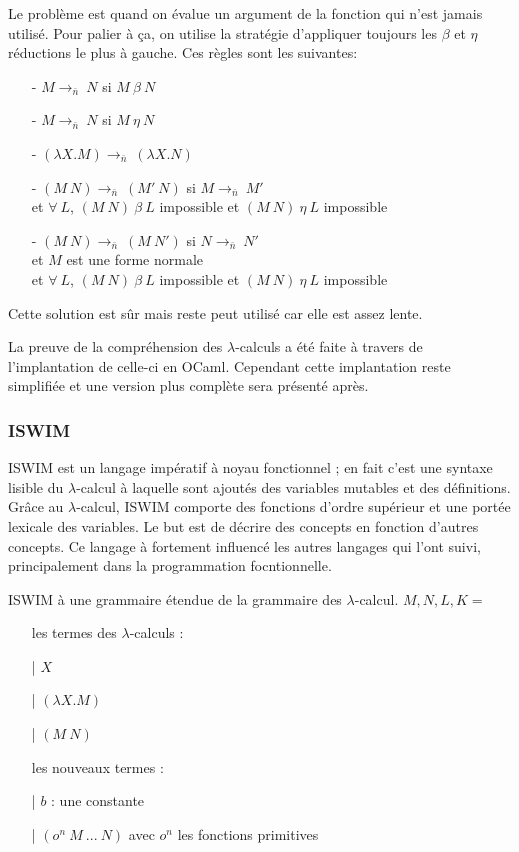 \documentclass[10pt,a4paper]{article}
\begin{document}
			Le problème est quand on évalue un argument de la fonction qui n'est jamais utilisé. Pour palier à ça, on utilise la stratégie d'appliquer toujours les $\beta$ et $\eta$ réductions le plus à gauche. Ces règles sont les suivantes:
			\begin{itemize}
				\item[-] $M \longrightarrow_{\bar{n}}~N$ si $M~\beta~N$
				\item[-] $M \longrightarrow_{\bar{n}}~N$ si $M~\eta~N$
				\item[-] $(\lambda X.M) \longrightarrow_{\bar{n}}~(\lambda X.N)$
				\item[-] $(M~N) \longrightarrow_{\bar{n}}~(M'~N)$ si $M \longrightarrow_{\bar{n}}~M'$
				\\ et $\forall~L$, $(M~N)~\beta~L$ impossible et $(M~N)~\eta~L$ impossible
				\item[-] $(M~N) \longrightarrow_{\bar{n}}~(M~N')$ si $N \longrightarrow_{\bar{n}}~N'$
				\\ et $M$ est une forme normale
				\\ et  $\forall~L$, $(M~N)~\beta~L$ impossible et $(M~N)~\eta~L$ impossible
			\end{itemize}
			\smallbreak
			Cette solution est sûr mais reste peut utilisé car elle est assez lente. 
			\medbreak
			
			La preuve de la compréhension des $\lambda$-calculs a été faite à travers de l'implantation de celle-ci en OCaml. Cependant cette implantation reste simplifiée et une version plus complète sera présenté après. 
			
			\subsubsection{ISWIM}	
			
			ISWIM est un langage impératif à noyau fonctionnel ; en fait c'est une syntaxe lisible du $\lambda$-calcul à laquelle sont ajoutés des variables mutables et des définitions. Grâce au $\lambda$-calcul, ISWIM comporte des fonctions d'ordre supérieur et une portée lexicale des variables. Le but est de décrire des concepts en fonction d'autres concepts. Ce langage à fortement influencé les autres langages qui l'ont suivi, principalement dans la programmation focntionnelle.
			\medbreak
			 
			ISWIM à une grammaire étendue de la grammaire des $\lambda$-calcul.
			\smallbreak
			$M,N,L,K =$
			\begin{itemize}
				\item[ ] les termes des $\lambda$-calculs :
				\item[|] $X$ 
				\item[|] $(\lambda X.M)$
				\item[|] $(M~N)$
				\item[ ] les nouveaux termes :
				\item[|] $b$ : une constante
				\item[|] $(o^{n}~M~...~N)$ avec $o^{n}$ les fonctions primitives
			\end{itemize}
			\medbreak
			
\end{document}

